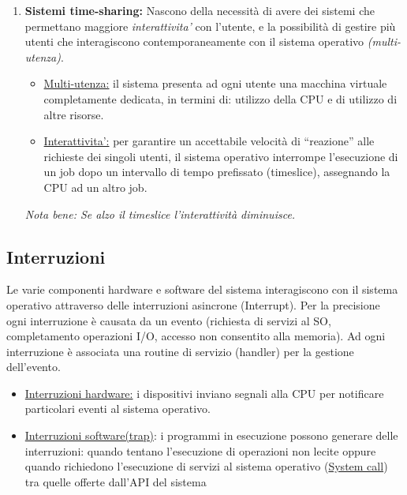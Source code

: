 \documentclass{article}
\begin{document}
\begin{enumerate}
    \item \textbf{Sistemi time-sharing:} Nascono della necessità di avere dei sistemi
    che permettano maggiore \textit{interattivita'} con l'utente, e la possibilità di gestire 
    più utenti che interagiscono contemporaneamente con il sistema operativo \textit{(multi-utenza)}.

    \begin{itemize}
        \item \underline{Multi-utenza:} il sistema presenta ad ogni utente una macchina virtuale completamente 
        dedicata, in termini di: utilizzo della CPU e di utilizzo di altre risorse.
        \item \underline{Interattivita':} per garantire un accettabile velocità di “reazione” alle richieste
        dei singoli utenti, il sistema operativo interrompe l'esecuzione di un job dopo un 
        intervallo di tempo prefissato (timeslice), assegnando la CPU ad un altro job.
        
    \end{itemize}

    \textit{Nota bene: Se alzo il timeslice l’interattività diminuisce.}
\end{enumerate}

\subsection{Interruzioni}
Le varie componenti hardware e software del sistema interagiscono con il sistema operativo 
attraverso delle interruzioni asincrone (Interrupt).
Per la precisione ogni interruzione è causata da un evento (richiesta di servizi al SO,
completamento operazioni I/O, accesso non consentito alla memoria). Ad ogni interruzione è 
associata una routine di servizio (handler) per la gestione dell'evento.

\begin{itemize}
    \item \underline{Interruzioni hardware:} i dispositivi inviano segnali alla CPU per notificare particolari 
    eventi al sistema operativo.
    \item \underline{Interruzioni software(trap)}: i programmi in esecuzione possono generare 
    delle interruzioni: quando tentano l'esecuzione di operazioni non lecite oppure quando 
    richiedono l'esecuzione di servizi al sistema operativo (\underline{System call}) 
    tra quelle offerte dall’API del sistema
\end{itemize}
\end{document}
